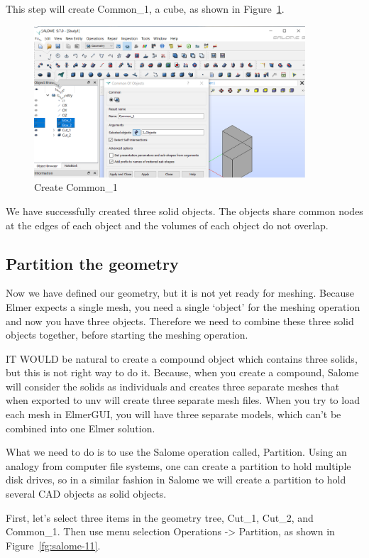 This step will create Common\_1, a cube, as shown in Figure~\ref{fg:salome-10}.

\begin{figure}[H]
\centering
\includegraphics[width=0.9\textwidth]{Salome-10}
\caption{Create Common\_1}\label{fg:salome-10}
\end{figure}

We have successfully created three solid objects.  The objects share common nodes at the edges of each object and the volumes of each object do not overlap.

\subsection{Partition the geometry}

Now we have defined our geometry, but it is not yet ready for meshing. Because Elmer expects a single mesh, you need a single `object' for the meshing operation and now you have three objects. Therefore we need to combine these three solid objects together, before starting the meshing operation.

IT WOULD be natural to create a compound object which contains three solids, but this is not right way to do it. Because, when you create a compound, Salome will consider the solids as individuals and creates three separate meshes that when exported to unv will create three separate mesh files.  When you try to load each mesh in ElmerGUI, you will have three separate models, which can't be combined into one Elmer solution.

What we need to do is to use the Salome operation called, Partition.  Using an analogy from computer file systems, one can create a partition to hold multiple disk drives, so in a similar fashion in Salome we will create a partition to hold several CAD objects as solid objects.

First, let's select three items in the geometry tree, Cut\_1, Cut\_2, and Common\_1.  Then use menu selection Operations -> Partition, as shown in Figure~\ref{fg:salome-11}.

